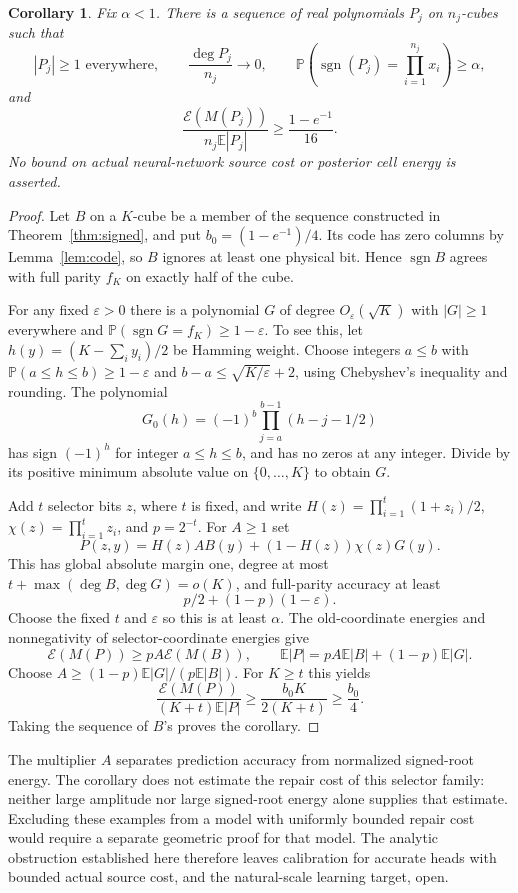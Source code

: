 \documentclass[10pt]{article}
\newtheorem{corollary}[theorem]{Corollary}
\newcommand{\E}{\mathbb E}
\newcommand{\Prb}{\mathbb P}
\newcommand{\En}{\mathcal E}
\newcommand{\sgn}{\operatorname{sgn}}
\begin{document}
\begin{corollary}\label{cor:accuracy}
Fix $\alpha<1$. There is a sequence of real polynomials $P_j$ on
$n_j$-cubes such that
\[
 |P_j|\ge1\text{ everywhere},\qquad
 \frac{\deg P_j}{n_j}\longrightarrow0,\qquad
 \Prb\left(\sgn(P_j)=\prod_{i=1}^{n_j}x_i\right)\ge\alpha,
\]
and
\[
 \frac{\En(M(P_j))}{n_j\E|P_j|}\ge\frac{1-e^{-1}}{16}.
\]
No bound on actual neural-network source cost or posterior cell energy
is asserted.
\end{corollary}
\begin{proof}
Let $B$ on a $K$-cube be a member of the sequence constructed in
Theorem~\ref{thm:signed}, and put $b_0=(1-e^{-1})/4$. Its code has
zero columns by Lemma~\ref{lem:code}, so $B$ ignores at least one
physical bit. Hence $\sgn B$ agrees with full parity $f_K$ on exactly
half of the cube.

For any fixed $\varepsilon>0$ there is a polynomial $G$ of degree
$O_\varepsilon(\sqrt K)$ with $|G|\ge1$ everywhere and
$\Prb(\sgn G=f_K)\ge1-\varepsilon$. To see this, let
$h(y)=(K-\sum_i y_i)/2$ be Hamming weight. Choose integers $a\le b$
with $\Prb(a\le h\le b)\ge1-\varepsilon$ and
$b-a\le\sqrt{K/\varepsilon}+2$, using Chebyshev's inequality and
rounding. The polynomial
\[
 G_0(h)=(-1)^b\prod_{j=a}^{b-1}(h-j-1/2)
\]
has sign $(-1)^h$ for integer $a\le h\le b$, and has no zeros at
any integer. Divide by its positive minimum absolute value on
$\{0,\ldots,K\}$ to obtain $G$.

Add $t$ selector bits $z$, where $t$ is fixed, and write
$H(z)=\prod_{i=1}^t(1+z_i)/2$, $\chi(z)=\prod_{i=1}^t z_i$,
and $p=2^{-t}$. For $A\ge1$ set
\[
 P(z,y)=H(z)A B(y)+(1-H(z))\chi(z)G(y).
\]
This has global absolute margin one, degree at most
$t+\max(\deg B,\deg G)=o(K)$, and full-parity accuracy at least
\[
 p/2+(1-p)(1-\varepsilon).
\]
Choose the fixed $t$ and $\varepsilon$ so this is at least $\alpha$.
The old-coordinate energies and nonnegativity of selector-coordinate
energies give
\[
 \En(M(P))\ge pA\En(M(B)),\qquad
 \E|P|=pA\E|B|+(1-p)\E|G|.
\]
Choose $A\ge(1-p)\E|G|/(p\E|B|)$. For $K\ge t$ this yields
\[
 \frac{\En(M(P))}{(K+t)\E|P|}
 \ge\frac{b_0K}{2(K+t)}\ge\frac{b_0}{4}.
\]
Taking the sequence of $B$'s proves the corollary.
\end{proof}

The multiplier $A$ separates prediction accuracy from normalized
signed-root energy. The corollary does not estimate the repair cost of
this selector family: neither large amplitude nor large signed-root
energy alone supplies that estimate. Excluding these examples from a
model with uniformly bounded repair cost would require a separate
geometric proof for that model. The analytic obstruction established
here therefore leaves calibration for accurate heads with bounded
actual source cost, and the natural-scale learning target, open.
\end{document}
